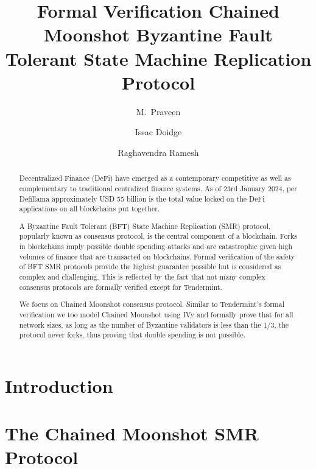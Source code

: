 \documentclass[a4paper,UKenglish,cleveref, autoref, thm-restate]{oasics-v2021}
\title{Formal Verification Chained Moonshot Byzantine Fault Tolerant State Machine Replication Protocol}
\author{M.~Praveen}{Chennai Mathematical Institute \and ReLaX}{}{}{Partially funded by a grant from the Infosys foundation}
\author{Issac Doidge}{SupraOracles}{}{}{}
\author{Raghavendra Ramesh}{SupraOracles}{}{}{}
\begin{document}
	\maketitle
	\begin{abstract}
Decentralized Finance (DeFi) have emerged as a contemporary competitive as well as complementary to traditional centralized finance systems. As of 23rd January 2024, per Defillama approximately USD 55 billion is the total value locked on the DeFi applications on all blockchains put together.

A Byzantine Fault Tolerant (BFT) State Machine Replication (SMR) protocol, popularly known as consensus protocol, is the central component of a blockchain. Forks in blockchains imply possible double spending attacks and are catastrophic given high volumes of finance that are transacted on blockchains. Formal verification of the safety of BFT SMR protocols provide the highest guarantee possible but is considered as complex and challenging. This is reflected by the fact that not many complex consensus protocols are formally verified except for Tendermint. 

We focus on Chained Moonshot consensus protocol. Similar to Tendermint's formal verification we too model Chained Moonshot using IVy and formally prove that for all network sizes, as long as the number of Byzantine validators is less than the 1/3, the protocol never forks, thus proving that double spending is not possible.
	\end{abstract}
\newcommand{\prcs}{\mathcal{V}}
\newcommand{\blkchn}{\mathbf{B}}

\section{Introduction}


\section{The Chained Moonshot SMR Protocol}

\end{document}

